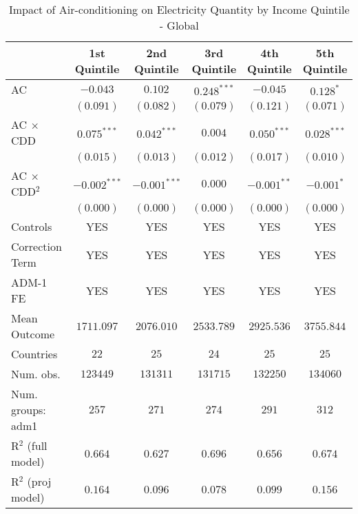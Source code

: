 
\begin{table}[htbp]
\caption{Impact of Air-conditioning on Electricity Quantity by Income Quintile - Global}
\begin{center}
\begin{tabular}{l c c c c c}
\hline
 & 1st Quintile & 2nd Quintile & 3rd Quintile & 4th Quintile & 5th Quintile \\
\hline
AC                      & $-0.043$       & $0.102$        & $0.248^{***}$ & $-0.045$      & $0.128^{*}$   \\
                        & $(0.091)$      & $(0.082)$      & $(0.079)$     & $(0.121)$     & $(0.071)$     \\
AC $\times$ CDD         & $0.075^{***}$  & $0.042^{***}$  & $0.004$       & $0.050^{***}$ & $0.028^{***}$ \\
                        & $(0.015)$      & $(0.013)$      & $(0.012)$     & $(0.017)$     & $(0.010)$     \\
AC $\times$ CDD$^2$     & $-0.002^{***}$ & $-0.001^{***}$ & $0.000$       & $-0.001^{**}$ & $-0.001^{*}$  \\
                        & $(0.000)$      & $(0.000)$      & $(0.000)$     & $(0.000)$     & $(0.000)$     \\
\hline
Controls                & YES            & YES            & YES           & YES           & YES           \\
Correction Term         & YES            & YES            & YES           & YES           & YES           \\
ADM-1 FE                & YES            & YES            & YES           & YES           & YES           \\
Mean Outcome            & $1711.097$     & $2076.010$     & $2533.789$    & $2925.536$    & $3755.844$    \\
Countries               & $22$           & $25$           & $24$          & $25$          & $25$          \\
Num. obs.               & $123449$       & $131311$       & $131715$      & $132250$      & $134060$      \\
Num. groups: adm1       & $257$          & $271$          & $274$         & $291$         & $312$         \\
R$^2$ (full model)      & $0.664$        & $0.627$        & $0.696$       & $0.656$       & $0.674$       \\
R$^2$ (proj model)      & $0.164$        & $0.096$        & $0.078$       & $0.099$       & $0.156$       \\

\end{tabular}
\end{center}
\end{table}
